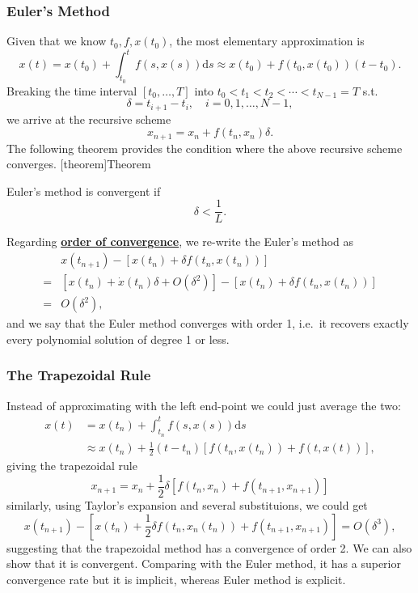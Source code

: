 \documentclass[twocolumn,landscape,10pt]{article}
\theoremstyle{definition}
\begin{document}
\subsubsection{Euler's Method}

Given that we know $t_0,f,x(t_0)$, the most elementary approximation is
\[
    x(t)=x(t_0)+\int_{t_0}^{t}f(s,x(s))\mathrm{d}s
    \approx x(t_0)+f(t_0,x(t_0))(t-t_0).
\]
Breaking the time interval $\left[t_0,\ldots,T\right]$ into
$t_0<t_1<t_2<\cdots<t_{N-1}=T$ s.t.
\[
    \delta=t_{i+1}-t_i,\quad i=0,1,\ldots,N-1,
\]
we arrive at the recursive scheme
\[
    x_{n+1}=x_n+f(t_n,x_n)\delta.
\]
The following theorem provides the condition where the above recursive scheme
converges.
[theorem]{Theorem}
\begin{euler converge L}
    Euler's method is convergent if
    \[
        \delta<\frac{1}{L}.
    \]
\end{euler converge L}
Regarding \textbf{\underline{order of convergence}}, we re-write the Euler's
method as
\begin{align*}
    & x(t_{n+1})-[x(t_n)+\delta f(t_n,x(t_n))] \\
    = & [x(t_n)+\dot{x}(t_n)\delta+O(\delta^2)]-[x(t_n)+\delta f(t_n,x(t_n))] \\
    = & O(\delta^2),
\end{align*}
and we say that the Euler method converges with order 1, i.e.\
it recovers exactly every polynomial solution of degree 1 or less.

\subsubsection{The Trapezoidal Rule}

Instead of approximating with the left end-point we could just average the two:
\begin{align*}
    x(t)
    &= x(t_n)+\int_{t_n}^{t} f(s,x(s))\mathrm{d}s \\
    &\approx x(t_n)+\frac{1}{2}(t-t_n)\left[f(t_n,x(t_n))+f(t,x(t))\right],
\end{align*}
giving the trapezoidal rule
\[
    x_{n+1}=x_n+\frac{1}{2}\delta\left[f(t_n,x_n)+f(t_{n+1},x_{n+1})\right]
\]
similarly, using Taylor's expansion and several substituions, we could get
\[
    x(t_{n+1})-\left[x(t_n)+\frac{1}{2}\delta f(t_n,x_n(t_n))+f(t_{n+1},x_{n+1})\right]
    =O(\delta^3),
\]
suggesting that the trapezoidal method has a convergence of order 2. We can also
show that it is convergent. Comparing with the Euler method, it has a superior
convergence rate but it is implicit, whereas Euler method is explicit.
\end{document}
